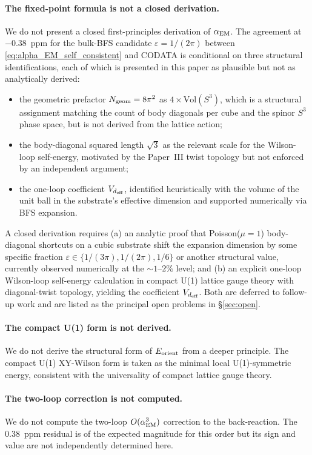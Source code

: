 \documentclass[11pt,a4paper]{article}
\begin{document}
\paragraph{The fixed-point formula is not a closed derivation.}
We do not present a closed first-principles derivation of
$\alpha_{\rm EM}$. The agreement at $-0.38$~ppm for the bulk-BFS candidate $\varepsilon = 1/(2\pi)$ between
\eqref{eq:alpha_EM_self_consistent} and CODATA is conditional
on three structural identifications, each of which is presented
in this paper as plausible but not as analytically derived:
\begin{itemize}
\item the geometric prefactor $N_{\rm geom} = 8\pi^2$ as
$4 \times \mathrm{Vol}(S^3)$, which is a structural assignment
matching the count of body diagonals per cube and the spinor
$S^3$ phase space, but is not derived from the lattice action;
\item the body-diagonal squared length $\sqrt{3}$ as the
relevant scale for the Wilson-loop self-energy, motivated by
the Paper~III twist topology but not enforced by an
independent argument;
\item the one-loop coefficient $V_{d_{\rm eff}}$, identified
heuristically with the volume of the unit ball in the
substrate's effective dimension and supported numerically via
BFS expansion.
\end{itemize}
A closed derivation requires (a) an analytic proof that
Poisson($\mu = 1$) body-diagonal shortcuts on a cubic substrate
shift the expansion dimension by some specific fraction $\varepsilon \in \{1/(3\pi), 1/(2\pi), 1/6\}$ or another structural value, currently
observed numerically at the $\sim 1\text{--}2\%$ level; and (b) an
explicit one-loop Wilson-loop self-energy calculation in
compact U(1) lattice gauge theory with diagonal-twist topology,
yielding the coefficient $V_{d_{\rm eff}}$. Both are deferred to
follow-up work and are listed as the principal open problems
in \S\ref{sec:open}.

\paragraph{The compact U(1) form is not derived.}
We do not derive the structural form of $E_{\rm orient}$ from a
deeper principle. The compact U(1) XY-Wilson form is taken as
the minimal local U(1)-symmetric energy, consistent with the
universality of compact lattice gauge theory.

\paragraph{The two-loop correction is not computed.}
We do not compute the two-loop $O(\alpha_{\rm EM}^3)$
correction to the back-reaction. The $0.38$~ppm residual is of
the expected magnitude for this order but its sign and value
are not independently determined here.
\end{document}
